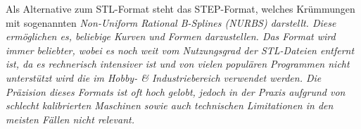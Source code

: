 \documentclass[../main.tex]{subfiles}
\begin{document}
Als Alternative zum STL-Format steht das STEP-Format, welches Krümmungen mit sogenannten \it{Non-Uniform Rational B-Splines (NURBS)} darstellt.
Diese ermöglichen es, beliebige Kurven und Formen darzustellen. Das Format wird immer beliebter, wobei es noch weit vom Nutzungsgrad der STL-Dateien entfernt ist, da es rechnerisch intensiver ist und von vielen populären Programmen nicht unterstützt wird die im Hobby- \& Industriebereich verwendet werden. Die Präzision dieses Formats ist oft hoch gelobt, jedoch in der Praxis aufgrund von schlecht kalibrierten Maschinen sowie auch technischen Limitationen in den meisten Fällen nicht relevant. \parencite{ADOBESTEP}
\end{document}
